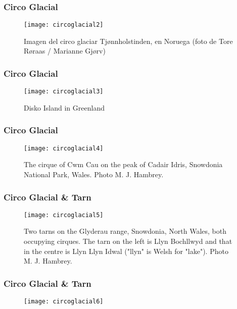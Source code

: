 \documentclass{beamer}
\begin{document}
\begin{frame}
\frametitle{Circo Glacial}
\begin{figure}
\begin{center}
\texttt{[image: circoglacial2]}
\end{center}
\caption{Imagen del circo glaciar Tjønnholstinden, en Noruega (foto de Tore Røraas / Marianne Gjørv)}
\end{figure}
\end{frame}
\begin{frame}
\frametitle{Circo Glacial}
\begin{figure}
\begin{center}
\texttt{[image: circoglacial3]}
\end{center}
\caption{Disko Island in Greenland}
\end{figure}
\end{frame}
\begin{frame}
\frametitle{Circo Glacial}
\begin{figure}
\begin{center}
\texttt{[image: circoglacial4]}
\end{center}
\caption{The cirque of Cwm Cau on the peak of Cadair Idris, Snowdonia National Park, Wales. Photo M. J. Hambrey.}
\end{figure}
\end{frame}
\begin{frame}
\frametitle{Circo Glacial \& Tarn}
\begin{figure}
\begin{center}
\texttt{[image: circoglacial5]}
\end{center}
\caption{Two tarns on the Glyderau range, Snowdonia, North Wales, both occupying cirques. The tarn on the left is Llyn Bochllwyd and that in the centre is Llyn Llyn Idwal ("llyn" is Welsh for "lake"). Photo M. J. Hambrey.}
\end{figure}
\end{frame}
\begin{frame}
\frametitle{Circo Glacial \& Tarn}
\begin{figure}
\begin{center}
\texttt{[image: circoglacial6]}
\end{center}
\end{figure}
\end{frame}
\end{document}
